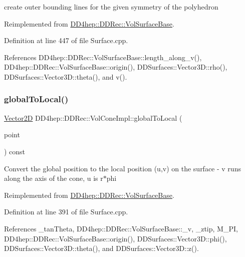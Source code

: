 create outer bounding lines for the given symmetry of the polyhedron 



Reimplemented from \hyperlink{class_d_d4hep_1_1_d_d_rec_1_1_vol_surface_base_ad0863cf8ceb6a443a048fe89cdc79f26}{D\+D4hep\+::\+D\+D\+Rec\+::\+Vol\+Surface\+Base}.



Definition at line 447 of file Surface.\+cpp.



References D\+D4hep\+::\+D\+D\+Rec\+::\+Vol\+Surface\+Base\+::length\+\_\+along\+\_\+v(), D\+D4hep\+::\+D\+D\+Rec\+::\+Vol\+Surface\+Base\+::origin(), D\+D\+Surfaces\+::\+Vector3\+D\+::rho(), D\+D\+Surfaces\+::\+Vector3\+D\+::theta(), and v().

\hypertarget{class_d_d4hep_1_1_d_d_rec_1_1_vol_cone_impl_ae45867d32eb1958d209f1e1670620976}{}\label{class_d_d4hep_1_1_d_d_rec_1_1_vol_cone_impl_ae45867d32eb1958d209f1e1670620976} 
\subsubsection{\texorpdfstring{global\+To\+Local()}{globalToLocal()}}
{\footnotesize\ttfamily \hyperlink{class_d_d_surfaces_1_1_vector2_d}{Vector2D} D\+D4hep\+::\+D\+D\+Rec\+::\+Vol\+Cone\+Impl\+::global\+To\+Local (\begin{DoxyParamCaption}\item[{const \hyperlink{class_d_d_surfaces_1_1_vector3_d}{Vector3D} \&}]{point }\end{DoxyParamCaption}) const\hspace{0.3cm}{\ttfamily [virtual]}}

Convert the global position to the local position (u,v) on the surface -\/ v runs along the axis of the cone, u is r$\ast$phi 

Reimplemented from \hyperlink{class_d_d4hep_1_1_d_d_rec_1_1_vol_surface_base_a9f2549dc5b7d2fbf58d1ef8c6699b49f}{D\+D4hep\+::\+D\+D\+Rec\+::\+Vol\+Surface\+Base}.



Definition at line 391 of file Surface.\+cpp.



References \+\_\+tan\+Theta, D\+D4hep\+::\+D\+D\+Rec\+::\+Vol\+Surface\+Base\+::\+\_\+v, \+\_\+ztip, M\+\_\+\+PI, D\+D4hep\+::\+D\+D\+Rec\+::\+Vol\+Surface\+Base\+::origin(), D\+D\+Surfaces\+::\+Vector3\+D\+::phi(), D\+D\+Surfaces\+::\+Vector3\+D\+::theta(), and D\+D\+Surfaces\+::\+Vector3\+D\+::z().

